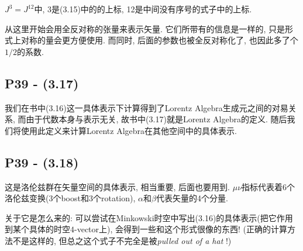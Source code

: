 $J^3 = J^{12}$中, 3是(3.15)中的的上标, 12是中间没有序号的式子中的上标.

从这里开始会用全反对称的张量来表示矢量.
它们所带有的信息是一样的, 只是形式上对称的量会更方便使用.
而同时, 后面的参数也被全反对称化了, 也因此多了个$1/2$的系数.


\subsection{P39 - (3.17)}

我们在书中(3.16)这一具体表示下计算得到了Lorentz Algebra生成元之间的对易关系, 而由于代数本身与表示无关, 故书中(3.17)就是Lorentz Algebra的定义.
随后我们将使用此定义来计算Lorentz Algebra在其他空间中的具体表示.

\subsection{P39 - (3.18)}

这是洛伦兹群在矢量空间的具体表示, 相当重要, 后面也要用到.
$\mu\nu$指标代表着6个洛伦兹变换(3个boost和3个rotation), $\alpha$和$\beta$代表矢量的4个分量.


关于它是怎么来的: 可以尝试在Minkowski时空中写出(3.16)的具体表示(把它作用到某个具体的时空$4$-vector上), 会得到一些和这个形式很像的东西! (正确的计算方法不是这样的, 但总之这个式子不完全是被\textit{pulled out of a hat} !)


